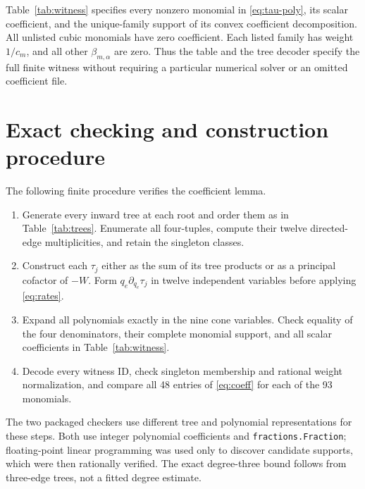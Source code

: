 \documentclass[11pt,a4paper]{article}
\begin{document}
\begin{table}[H]
\centering
\caption{Complete rooted-tree encoding. Each entry is a triple of
zero-based directed-edge indices, not a triple of vertex labels.}
\label{tab:trees}

\end{table}

Table~\ref{tab:witness} specifies every nonzero monomial in
\eqref{eq:tau-poly}, its scalar coefficient, and the unique-family
support of its convex coefficient decomposition. All unlisted cubic
monomials have zero coefficient. Each listed family has weight $1/c_m$,
and all other $\beta_{m,\alpha}$ are zero. Thus the table and the
tree decoder specify the full finite witness without requiring a
particular numerical solver or an omitted coefficient file.



\section{Exact checking and construction procedure}
\label{app:algorithm}

The following finite procedure verifies the coefficient lemma.
\begin{enumerate}
\item Generate every inward tree at each root and order them as in
Table~\ref{tab:trees}. Enumerate all four-tuples, compute their twelve
directed-edge multiplicities, and retain the singleton classes.
\item Construct each $\tau_j$ either as the sum of its tree products
or as a principal cofactor of $-W$. Form $q_e\partial_{q_e}\tau_j$
in twelve independent variables before applying \eqref{eq:rates}.
\item Expand all polynomials exactly in the nine cone variables.
Check equality of the four denominators, their complete monomial
support, and all scalar coefficients in Table~\ref{tab:witness}.
\item Decode every witness ID, check singleton membership and rational
weight normalization, and compare all 48 entries of \eqref{eq:coeff}
for each of the 93 monomials.
\end{enumerate}
The two packaged checkers use different tree and polynomial
representations for these steps. Both use integer polynomial
coefficients and \texttt{fractions.Fraction}; floating-point linear
programming was used only to discover candidate supports, which were
then rationally verified. The exact degree-three bound follows from
three-edge trees, not a fitted degree estimate.
\end{document}
